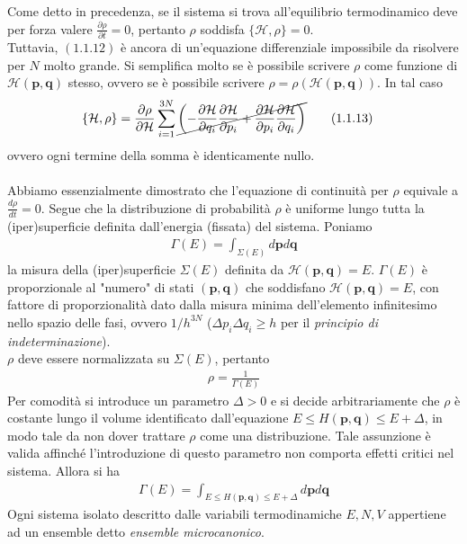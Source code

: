 \documentclass{article}
\begin{document}
Come detto in precedenza, se il sistema si trova all'equilibrio termodinamico deve per forza valere $\frac{\partial\rho}{\partial t} = 0$, pertanto $\rho$ soddisfa $\{\mathcal{H}, \rho\} = 0$. \\
Tuttavia, $(1.1.12)$ è ancora di un'equazione differenziale impossibile da risolvere per $N$ molto grande. Si semplifica molto se è possibile scrivere $\rho$ come funzione di $\mathcal{H}(\mathbf{p}, \mathbf{q})$ stesso, ovvero se è possibile scrivere $\rho = \rho(\mathcal{H}(\mathbf{p}, \mathbf{q}))$. In tal caso
\begin{align}
    \{\mathcal{H}, \rho\} &= \frac{\partial \rho}{\partial \mathcal{H}}\sum_{i = 1}^{3N}\cancel{\left(-\frac{\partial \mathcal{H}}{\partial q_i}\frac{\partial \mathcal{H}}{\partial p_i} + \frac{\partial \mathcal{H}}{\partial p_i}\frac{\partial \mathcal{H}}{\partial q_i}\right)} \tag{1.1.13}
\end{align}
ovvero ogni termine della somma è identicamente nullo. \\ \\
Abbiamo essenzialmente dimostrato che l'equazione di continuità per $\rho$ equivale a $\frac{d\rho}{dt} = 0$. Segue che la distribuzione di probabilità $\rho$ è uniforme lungo tutta la (iper)superficie definita dall'energia (fissata) del sistema. Poniamo
\begin{gather}
    \Gamma(E) = \int_{\Sigma(E)} d\mathbf{p}d\mathbf{q} \tag{1.1.14}
\end{gather}
la misura della (iper)superficie $\Sigma(E)$ definita da $\mathcal{H}(\mathbf{p}, \mathbf{q}) = E$. $\Gamma(E)$ è proporzionale al "numero" di stati $(\mathbf{p}, \mathbf{q})$ che soddisfano $\mathcal{H}(\mathbf{p}, \mathbf{q}) = E$, con fattore di proporzionalità dato dalla misura minima dell'elemento infinitesimo nello spazio delle fasi, ovvero $1/h^{3N}$ ($\Delta p_i\Delta q_i \geq h$ per il \textit{principio di indeterminazione}). \\
$\rho$ deve essere normalizzata su $\Sigma(E)$, pertanto
\begin{gather}
    \rho = \frac{1}{\Gamma(E)} \tag{1.1.15}
\end{gather}
Per comodità si introduce un parametro $\Delta > 0$ e si decide arbitrariamente che $\rho$ è costante lungo il volume identificato dall'equazione $E \leq H(\mathbf{p}, \mathbf{q}) \leq E + \Delta$, in modo tale da non dover trattare $\rho$ come una distribuzione. Tale assunzione è valida affinché l'introduzione di questo parametro non comporta effetti critici nel sistema.  Allora si ha
\begin{gather}
    \Gamma(E) = \int_{E \leq H(\mathbf{p}, \mathbf{q}) \leq E + \Delta} d\mathbf{p}d\mathbf{q} \tag{1.1.16}
\end{gather}
Ogni sistema isolato descritto dalle variabili termodinamiche $E, N, V$ appertiene ad un ensemble detto \textit{ensemble microcanonico}. \\
\end{document}
